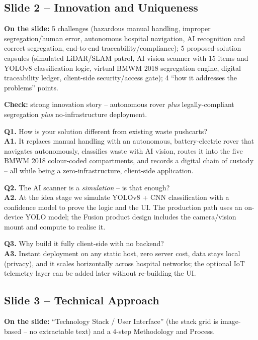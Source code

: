 \documentclass[11pt, a4paper]{article}
\begin{document}
\subsection{Slide 2 -- Innovation and Uniqueness}
\textbf{On the slide:} 5 challenges (hazardous manual handling, improper
segregation/human error, autonomous hospital navigation, AI recognition and
correct segregation, end-to-end traceability/compliance); 5 proposed-solution
capsules (simulated LiDAR/SLAM patrol, AI vision scanner with 15 items and
YOLOv8 classification logic, virtual BMWM 2018 segregation engine, digital
traceability ledger, client-side security/access gate); 4 ``how it addresses
the problems'' points.

\textbf{Check:} strong innovation story -- autonomous rover \emph{plus}
legally-compliant segregation \emph{plus} no-infrastructure deployment.

\begin{qabox}
\textbf{Q1.} How is your solution different from existing waste pushcarts?\\
\textbf{A1.} It replaces manual handling with an autonomous, battery-electric
rover that navigates autonomously, classifies waste with AI vision, routes it
into the five BMWM 2018 colour-coded compartments, and records a digital chain
of custody -- all while being a zero-infrastructure, client-side application.

\textbf{Q2.} The AI scanner is a \emph{simulation} -- is that enough?\\
\textbf{A2.} At the idea stage we simulate YOLOv8 + CNN classification with a
confidence model to prove the logic and the UI. The production path uses an
on-device YOLO model; the Fusion product design includes the camera/vision
mount and compute to realise it.

\textbf{Q3.} Why build it fully client-side with no backend?\\
\textbf{A3.} Instant deployment on any static host, zero server cost, data
stays local (privacy), and it scales horizontally across hospital networks;
the optional IoT telemetry layer can be added later without re-building the UI.
\end{qabox}

\subsection{Slide 3 -- Technical Approach}
\textbf{On the slide:} ``Technology Stack / User Interface'' (the stack grid is
image-based -- no extractable text) and a 4-step Methodology and Process.
\end{document}
